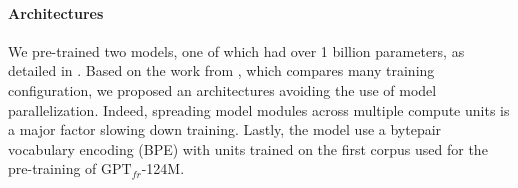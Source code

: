 




\paragraph{Architectures} We pre-trained two models, one of which had over 1 billion parameters, as detailed in . Based on the work from \textcite{shoeybi_19}, which compares many training configuration, we proposed an architectures avoiding the use of model parallelization. Indeed, spreading model modules across multiple compute units is a major factor slowing down training. Lastly, the model use a bytepair vocabulary encoding (BPE) with  units \parencite{sennrich_16a} trained on the first corpus used for the pre-training of $\text{GPT}_{fr}$-124M.


